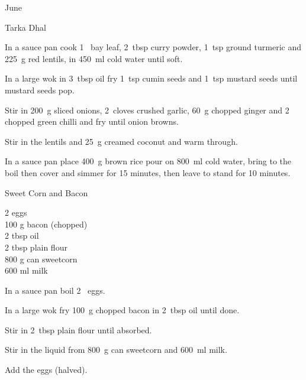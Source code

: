 \begin{menu}{June}
\begin{recipe}{2}{Tarka Dhal}
	
    \begin{instructions}
    \item 
        In a sauce pan cook
        1~  bay leaf,
        2~tbsp  curry powder,
        1~tsp  ground turmeric
        and
        225~g  red lentils,
        in
        450~ml  cold water
        until soft.
      \item 
        In a large wok in
        3~tbsp  oil
        fry
        1~tsp  cumin seeds
        and
        1~tsp  mustard seeds
        until mustard seeds pop.
      \item 
        Stir in
        200~g sliced onions,
        2~cloves crushed garlic,
        60~g chopped ginger
        and
        2~ chopped green chilli
        and
        fry until onion browns.
      \item 
        Stir in the lentils
        and
        25~g  creamed coconut
        and warm through.
      \item 
    In a
    sauce pan
    place
    400~g  brown rice
    pour on
    800~ml  cold water,
    bring to the boil then cover and simmer for 15 minutes,
    then leave to stand for 10 minutes.
  
    \end{instructions}
    \end{recipe}%
  
    \begin{recipe}{1}{Sweet Corn and Bacon}%
		\begin{ingredients}
		2  eggs  \\
	100 g bacon (chopped) \\
	2 tbsp oil  \\
	2 tbsp plain flour  \\
	800 g can sweetcorn  \\
	600 ml milk  \\
	
		\end{ingredients}
	
	
    \begin{instructions}
    \item 
        In a sauce pan boil
        2~  eggs.
      \item 
        In a large wok fry
        100~g chopped bacon
        in
        2~tbsp  oil
        until done.
      \item 
        Stir in
        2~tbsp  plain flour
        until absorbed.
      \item 
        Stir in the liquid from
        800~g  can sweetcorn
        and
        600~ml  milk.
      \item 
        Add the eggs (halved).
      
    \end{instructions}
    \end{recipe}%
  
    \clearpage
    \end{menu}
	

